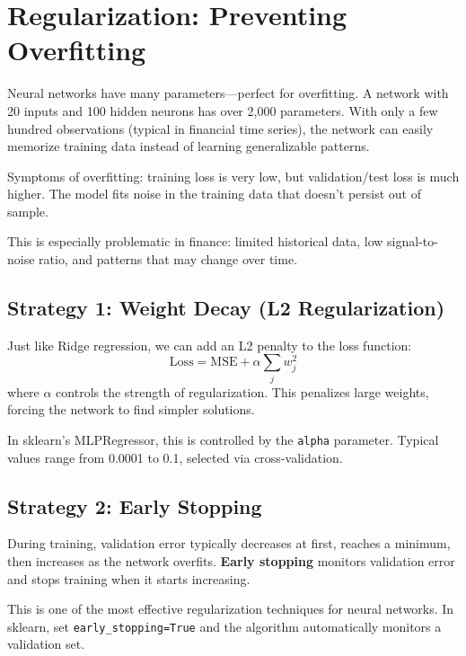 \documentclass[11pt,a4paper]{article}
\newcommand{\keyword}[1]{\textbf{\textcolor{AccentOrange}{#1}}}
\begin{document}
\section{Regularization: Preventing Overfitting}

Neural networks have many parameters---perfect for overfitting. A network with 20 inputs and 100 hidden neurons has over 2,000 parameters. With only a few hundred observations (typical in financial time series), the network can easily memorize training data instead of learning generalizable patterns.

Symptoms of overfitting: training loss is very low, but validation/test loss is much higher. The model fits noise in the training data that doesn't persist out of sample.

This is especially problematic in finance: limited historical data, low signal-to-noise ratio, and patterns that may change over time.

\subsection{Strategy 1: Weight Decay (L2 Regularization)}

Just like Ridge regression, we can add an L2 penalty to the loss function:
\[
\text{Loss} = \text{MSE} + \alpha \sum_j w_j^2
\]
where $\alpha$ controls the strength of regularization. This penalizes large weights, forcing the network to find simpler solutions.

In sklearn's MLPRegressor, this is controlled by the \texttt{alpha} parameter. Typical values range from 0.0001 to 0.1, selected via cross-validation.

\subsection{Strategy 2: Early Stopping}

During training, validation error typically decreases at first, reaches a minimum, then increases as the network overfits. \keyword{Early stopping} monitors validation error and stops training when it starts increasing.

This is one of the most effective regularization techniques for neural networks. In sklearn, set \texttt{early\_stopping=True} and the algorithm automatically monitors a validation set.
\end{document}
